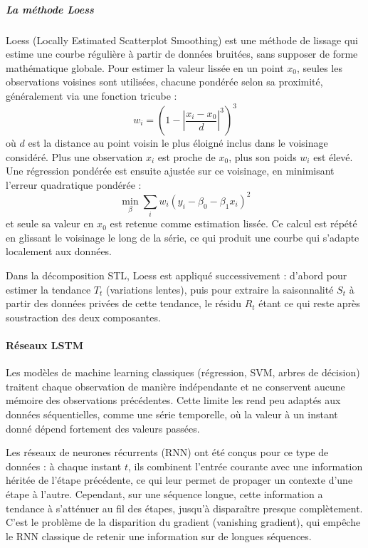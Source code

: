\documentclass[a4paper,12pt, oneside]{article}
\begin{document}
\subparagraph{La méthode Loess\\}
Loess (Locally Estimated Scatterplot Smoothing) est une méthode de lissage qui estime une courbe régulière à partir de données bruitées, sans supposer de forme mathématique globale. Pour estimer la valeur lissée en un point $x_0$, seules les observations voisines sont utilisées, chacune pondérée selon sa proximité, généralement via une fonction tricube :
\[
w_i = \left(1 - \left|\frac{x_i - x_0}{d}\right|^3\right)^3
\]
où $d$ est la distance au point voisin le plus éloigné inclus dans le voisinage considéré. Plus une observation $x_i$ est proche de $x_0$, plus son poids $w_i$ est élevé. Une régression pondérée est ensuite ajustée sur ce voisinage, en minimisant l'erreur quadratique pondérée :
\[
\min_{\beta} \sum_{i} w_i \left(y_i - \beta_0 - \beta_1 x_i\right)^2
\]
et seule sa valeur en $x_0$ est retenue comme estimation lissée. Ce calcul est répété en glissant le voisinage le long de la série, ce qui produit une courbe qui s'adapte localement aux données.

Dans la décomposition STL, Loess est appliqué successivement : d'abord pour estimer la tendance $T_t$ (variations lentes), puis pour extraire la saisonnalité $S_t$ à partir des données privées de cette tendance, le résidu $R_t$ étant ce qui reste après soustraction des deux composantes.

\paragraph{Réseaux LSTM\\}
Les modèles de machine learning classiques (régression, SVM, arbres de décision) traitent chaque observation de manière indépendante et ne conservent aucune mémoire des observations précédentes. Cette limite les rend peu adaptés aux données séquentielles, comme une série temporelle, où la valeur à un instant donné dépend fortement des valeurs passées.

Les réseaux de neurones récurrents (RNN) ont été conçus pour ce type de données : à chaque instant $t$, ils combinent l'entrée courante avec une information héritée de l'étape précédente, ce qui leur permet de propager un contexte d'une étape à l'autre. Cependant, sur une séquence longue, cette information a tendance à s'atténuer au fil des étapes, jusqu'à disparaître presque complètement. C'est le problème de la disparition du gradient (vanishing gradient), qui empêche le RNN classique de retenir une information sur de longues séquences.
\end{document}
